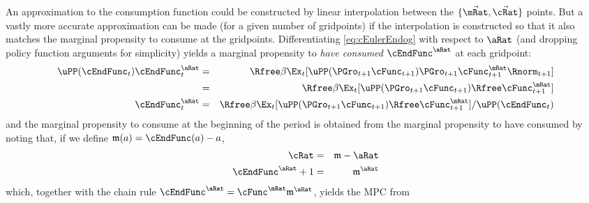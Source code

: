 \documentclass[../BufferStockTheory.tex]{subfiles}
\begin{document}
An approximation to the consumption function could be constructed by
linear interpolation between the $\{\vec{\mRat},\vec{\cRat}\}$ points.
But a vastly more accurate approximation can be made (for a given
number of gridpoints) if the interpolation is constructed so that it
also matches the marginal propensity to consume at the gridpoints. Differentiating \eqref{eq:cEulerEndog}
with respect to $\aRat$ (and dropping policy function arguments for
simplicity) yields a marginal propensity to {\it have consumed} $\cEndFunc^{\aRat}$ at
each gridpoint:
\begin{eqnarray}
\uPP(\cEndFunc_{t})\cEndFunc_{t}^{\aRat} & = & \Rfree \beta \Ex_{t}[\uPP(\PGro_{t+1} \cFunc_{t+1})\PGro_{t+1} \cFunc^{\mRat}_{t+1}\Rnorm_{t+1}] \notag
\\ & = & \Rfree \beta \Ex_{t}[\uPP(\PGro_{t+1} \cFunc_{t+1}) \Rfree \cFunc^{\mRat}_{t+1}] \notag
\\ \cEndFunc_{t}^{\aRat} & = & \Rfree \beta \Ex_{t}[\uPP(\PGro_{t+1}  \cFunc_{t+1}) \Rfree \cFunc^{\mRat}_{t+1}]/\uPP(\cEndFunc_{t}) \label{eq:MPTHC}
\end{eqnarray}
and the marginal propensity to consume at the beginning of the period is obtained from the marginal
propensity to have consumed by noting that, if we define $\mathfrak{m}(a) = \cEndFunc(a)-a$,
\begin{eqnarray*}
   \cRat & = & \mathfrak{m}-\aRat
\\ \cEndFunc^{\aRat}+1 & = & \mathfrak{m}^{\aRat}
\end{eqnarray*}
which, together with the chain rule $\cEndFunc^{\aRat}  = \cFunc^{\mRat}\mathfrak{m}^{\aRat}$,
yields the MPC from
\end{document}
